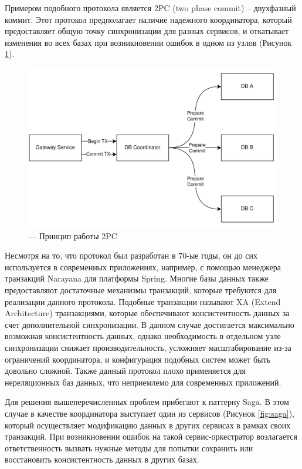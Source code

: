 Примером подобного протокола является 2PC (two phase commit) -- двухфазный коммит. Этот протокол предполагает
наличие надежного координатора, который предоставляет общую точку синхронизации для разных сервисов, и откатывает изменения
во всех базах при возникновении ошибок в одном из узлов (Рисунок \ref{fig:twopc}).
\begin{figure}[H]
    \centering
    \includegraphics[width=0.8\linewidth]{img/2pc.png}
    \caption{--- Принцип работы 2PC}
    \label{fig:twopc}
\end{figure}

Несмотря на то, что протокол был разработан в 70-ые годы, он до сих используется в современных приложениях, например,
с помощью менеджера транзакций Narayana для платформы Spring. Многие базы данных также предоставляют достаточные механизмы транзакций, которые
требуются для реализации данного протокола. Подобные транзакции называют XA (Extend Architecture) транзакциями, которые обеспечивают
консистентность данных за счет дополнительной синхронизации.
В данном случае достигается максимально возможная консистентность данных, однако
необходимость в отдельном узле синхронизации снижает производительность, усложняет масштабирование из-за ограничений координатора, и конфигурация подобных систем
может быть довольно сложной.
Также данный протокол плохо применяется
для нереляционных баз данных, что неприемлемо для современных приложений.

Для решения вышеперечисленных проблем прибегают к паттерну Saga. В этом случае в качестве координатора
выступает один из сервисов (Рисунок \ref{fig:saga}), который осуществляет модификацию данных в других сервисах в рамках своих транзакций.
При возникновении ошибок на такой сервис-оркестратор возлагается ответственность вызвать нужные методы
для попытки сохранить или восстановить консистентность данных в других базах.

